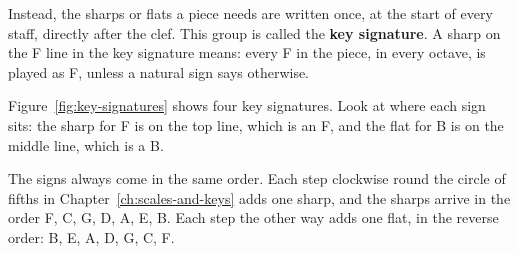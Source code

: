 Instead, the sharps or flats a piece needs are written once, at the start of every staff, directly after the clef. This group is called the \textbf{key signature}. A sharp on the F line in the key signature means: every F in the piece, in every octave, is played as F\sh, unless a natural sign says otherwise.

Figure~\ref{fig:key-signatures} shows four key signatures. Look at where each sign sits: the sharp for F\sh{} is on the top line, which is an F, and the flat for B\fl{} is on the middle line, which is a B.

The signs always come in the same order. Each step clockwise round the circle of fifths in Chapter~\ref{ch:scales-and-keys} adds one sharp, and the sharps arrive in the order F, C, G, D, A, E, B. Each step the other way adds one flat, in the reverse order: B, E, A, D, G, C, F.

